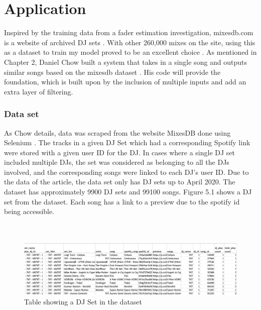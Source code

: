 
\graphicspath{{Chapter5/}}



\chapter{Application}

Inspired by the training data from a fader estimation investigation, mixesdb.com is a website of archived DJ sets \citep{kim_automatic_2017}. With other 260,000 mixes on the site, using this as a dataset to train my model proved to be an excellent choice \citep{mixesdb_main_2023}. As mentioned in Chapter 2, Daniel Chow built a system that takes in a single song and outputs similar songs based on the mixesdb dataset \citep{chow_music_2020}. His code will provide the foundation, which is built upon by the inclusion of multiple inputs and add an extra layer of filtering.

\subsection{Data set}
As Chow details, data was scraped from the website MixesDB done using Selenium \citep{chow_music_2020}. The tracks in a given DJ Set which had a corresponding Spotify link were stored with a given user ID for the DJ.  In cases where a single DJ set included multiple DJs, the set was considered as belonging to all the DJs involved, and the corresponding songs were linked to each DJ's user ID.  Due to the data of the article, the data set only has DJ sets up to April 2020. The dataset has approximately 9900 DJ sets and 99100 songs. Figure 5.1 shows a DJ set from the dataset. Each song has a link to a preview due to the spotify id being accessible.
\\
\\
\\
\begin{figure}[H]
	\hspace*{-1.8cm}   
	\includegraphics[scale=0.55]{images/dataset}
	\centering
	\caption{Table showing a DJ Set in the dataset} 
\end{figure}


